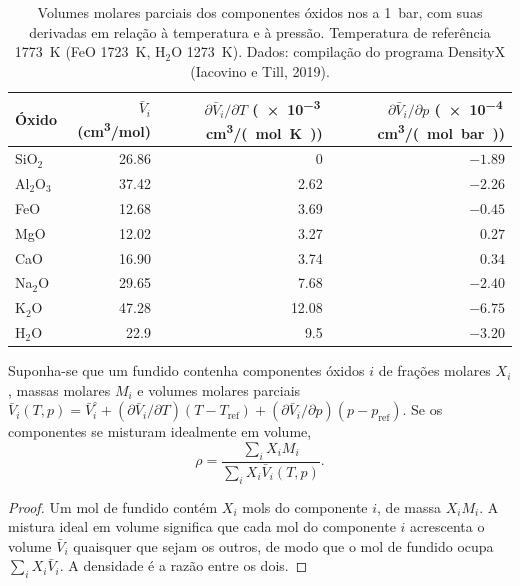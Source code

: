 \begin{table}[ht]
\centering\small
\begin{tabular}{lrrr}
\hline
Óxido & $\bar V_i$ (\unit{cm^3/mol}) & $\partial\bar V_i/\partial T$ (\num{e-3}\,\unit{cm^3/(mol.K)}) & $\partial\bar V_i/\partial p$ (\num{e-4}\,\unit{cm^3/(mol.bar)}) \\
\hline
SiO$_2$  & 26.86 & 0     & $-1.89$ \\
Al$_2$O$_3$ & 37.42 & 2.62 & $-2.26$ \\
FeO      & 12.68 & 3.69  & $-0.45$ \\
MgO      & 12.02 & 3.27  & $0.27$ \\
CaO      & 16.90 & 3.74  & $0.34$ \\
Na$_2$O  & 29.65 & 7.68  & $-2.40$ \\
K$_2$O   & 47.28 & 12.08 & $-6.75$ \\
H$_2$O   & 22.9  & 9.5   & $-3.20$ \\
\hline
\end{tabular}
\caption{Volumes molares parciais dos componentes óxidos nos  a
\qty{1}{bar}, com suas derivadas em relação à temperatura e à pressão. Temperatura
de referência \qty{1773}{K} (FeO \qty{1723}{K}, H$_2$O \qty{1273}{K}). Dados:
compilação do programa DensityX (Iacovino e Till, 2019).}
\label{tab:b2:magma-emplacement:volumes}
\end{table}

\begin{proposition}\label{prop:b2:magma-emplacement:density}
Suponha-se que um fundido contenha componentes óxidos $i$ de frações molares $X_i$, massas molares
$M_i$ e volumes molares parciais $\bar V_i(T, p) = \bar V_i^{\circ} + (\partial\bar
V_i/\partial T)(T - T_{\mathrm{ref}}) + (\partial\bar V_i/\partial p)(p - p_{\mathrm{ref}})$.
Se os componentes se misturam idealmente em volume,
\[
\rho = \frac{\sum_i X_i M_i}{\sum_i X_i \bar V_i(T,p)}.
\]
\end{proposition}

\begin{proof}
Um mol de fundido contém $X_i$ mols do componente $i$, de massa $X_iM_i$. A mistura
ideal em volume significa que cada mol do componente $i$ acrescenta o volume $\bar V_i$
quaisquer que sejam os outros, de modo que o mol de fundido ocupa $\sum_i X_i\bar V_i$. A
densidade é a razão entre os dois.
\end{proof}

